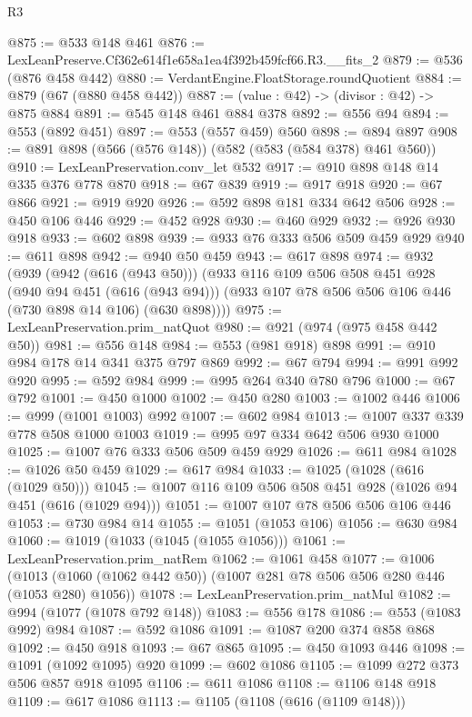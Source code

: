 \begin{lexlean}{R3}
\begin{coremodule}
@875 := @533 @148 @461
@876 := LexLeanPreserve.Cf362e614f1e658a1ea4f392b459fcf66.R3.__fits_2
@879 := @536 (@876 @458 @442)
@880 := VerdantEngine.FloatStorage.roundQuotient
@884 := @879 (@67 (@880 @458 @442))
@887 := (value : @42) -> (divisor : @42) -> @875 @884
@891 := @545 @148 @461 @884 @378
@892 := @556 @94
@894 := @553 (@892 @451)
@897 := @553 (@557 @459) @560
@898 := @894 @897
@908 := @891 @898 (@566 (@576 @148)) (@582 (@583 (@584 @378) @461 @560))
@910 := LexLeanPreservation.conv_let @532
@917 := @910 @898 @148 @14 @335 @376 @778 @870
@918 := @67 @839
@919 := @917 @918
@920 := @67 @866
@921 := @919 @920
@926 := @592 @898 @181 @334 @642 @506
@928 := @450 @106 @446
@929 := @452 @928
@930 := @460 @929
@932 := @926 @930 @918
@933 := @602 @898
@939 := @933 @76 @333 @506 @509 @459 @929
@940 := @611 @898
@942 := @940 @50 @459
@943 := @617 @898
@974 := @932
    (@939
      (@942 (@616 (@943 @50)))
      (@933
        @116
        @109
        @506
        @508
        @451
        @928
        (@940 @94 @451 (@616 (@943 @94)))
        (@933 @107 @78 @506 @506 @106 @446 (@730 @898 @14 @106) (@630 @898))))
@975 := LexLeanPreservation.prim_natQuot
@980 := @921 (@974 (@975 @458 @442 @50))
@981 := @556 @148
@984 := @553 (@981 @918) @898
@991 := @910 @984 @178 @14 @341 @375 @797 @869
@992 := @67 @794
@994 := @991 @992 @920
@995 := @592 @984
@999 := @995 @264 @340 @780 @796
@1000 := @67 @792
@1001 := @450 @1000
@1002 := @450 @280
@1003 := @1002 @446
@1006 := @999 (@1001 @1003) @992
@1007 := @602 @984
@1013 := @1007 @337 @339 @778 @508 @1000 @1003
@1019 := @995 @97 @334 @642 @506 @930 @1000
@1025 := @1007 @76 @333 @506 @509 @459 @929
@1026 := @611 @984
@1028 := @1026 @50 @459
@1029 := @617 @984
@1033 := @1025 (@1028 (@616 (@1029 @50)))
@1045 := @1007 @116 @109 @506 @508 @451 @928 (@1026 @94 @451 (@616 (@1029 @94)))
@1051 := @1007 @107 @78 @506 @506 @106 @446
@1053 := @730 @984 @14
@1055 := @1051 (@1053 @106)
@1056 := @630 @984
@1060 := @1019 (@1033 (@1045 (@1055 @1056)))
@1061 := LexLeanPreservation.prim_natRem
@1062 := @1061 @458
@1077 := @1006
    (@1013 (@1060 (@1062 @442 @50)) (@1007 @281 @78 @506 @506 @280 @446 (@1053 @280) @1056))
@1078 := LexLeanPreservation.prim_natMul
@1082 := @994 (@1077 (@1078 @792 @148))
@1083 := @556 @178
@1086 := @553 (@1083 @992) @984
@1087 := @592 @1086
@1091 := @1087 @200 @374 @858 @868
@1092 := @450 @918
@1093 := @67 @865
@1095 := @450 @1093 @446
@1098 := @1091 (@1092 @1095) @920
@1099 := @602 @1086
@1105 := @1099 @272 @373 @506 @857 @918 @1095
@1106 := @611 @1086
@1108 := @1106 @148 @918
@1109 := @617 @1086
@1113 := @1105 (@1108 (@616 (@1109 @148)))

\end{coremodule}
\end{lexlean}
